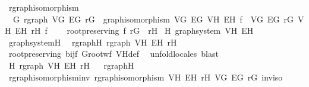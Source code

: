 \begin{isabellebody}
\isanewline
{}\isamarkupfalse%
\ rgraph{\isacharunderscore}{\kern0pt}isomorphism\ {\isacharequal}{\kern0pt}\isanewline
\ \ G{\isacharcolon}{\kern0pt}\ rgraph\ V\isactrlsub G\ E\isactrlsub G\ r\isactrlsub G\ {\isacharplus}{\kern0pt}\ graph{\isacharunderscore}{\kern0pt}isomorphism\ V\isactrlsub G\ E\isactrlsub G\ V\isactrlsub H\ E\isactrlsub H\ f\ \ V\isactrlsub G\ E\isactrlsub G\ r\isactrlsub G\ V\isactrlsub H\ E\isactrlsub H\ r\isactrlsub H\ f\ {\isacharplus}{\kern0pt}\isanewline
\ \ \ root{\isacharunderscore}{\kern0pt}preserving{\isacharcolon}{\kern0pt}\ {\isachardoublequoteopen}f\ r\isactrlsub G\ {\isacharequal}{\kern0pt}\ r\isactrlsub H{\isachardoublequoteclose}\isanewline
{}\isanewline
\isanewline
{}\isamarkupfalse%
\ H{\isacharcolon}{\kern0pt}\ graph{\isacharunderscore}{\kern0pt}system\ V\isactrlsub H\ E\isactrlsub H%
\isadelimproof
\ %
\endisadelimproof
%
\isatagproof
{}\isamarkupfalse%
\ graph{\isacharunderscore}{\kern0pt}system{\isacharunderscore}{\kern0pt}H\ \isacommand{{\isachardot}{\kern0pt}}\isamarkupfalse%
%
\endisatagproof
{\isafoldproof}%
%
\isadelimproof
%
\endisadelimproof
\isanewline
\isanewline
{}\isamarkupfalse%
\ rgraph{\isacharunderscore}{\kern0pt}H{\isacharcolon}{\kern0pt}\ {\isachardoublequoteopen}rgraph\ V\isactrlsub H\ E\isactrlsub H\ r\isactrlsub H{\isachardoublequoteclose}\isanewline
%
\isadelimproof
\ \ %
\endisadelimproof
%
\isatagproof
{}\isamarkupfalse%
\ root{\isacharunderscore}{\kern0pt}preserving\ bij{\isacharunderscore}{\kern0pt}f\ G{\isachardot}{\kern0pt}root{\isacharunderscore}{\kern0pt}wf\ V\isactrlsub H{\isacharunderscore}{\kern0pt}def\ \isamarkupfalse%
\ unfold{\isacharunderscore}{\kern0pt}locales\ blast%
\endisatagproof
{\isafoldproof}%
%
\isadelimproof
\isanewline
%
\endisadelimproof
\isanewline
{}\isamarkupfalse%
\ H{\isacharcolon}{\kern0pt}\ rgraph\ V\isactrlsub H\ E\isactrlsub H\ r\isactrlsub H%
\isadelimproof
\ %
\endisadelimproof
%
\isatagproof
{}\isamarkupfalse%
\ rgraph{\isacharunderscore}{\kern0pt}H\ \isacommand{{\isachardot}{\kern0pt}}\isamarkupfalse%
%
\endisatagproof
{\isafoldproof}%
%
\isadelimproof
%
\endisadelimproof
\isanewline
\isanewline
{}\isamarkupfalse%
\ rgraph{\isacharunderscore}{\kern0pt}isomorphism{\isacharunderscore}{\kern0pt}inv{\isacharcolon}{\kern0pt}\ {\isachardoublequoteopen}rgraph{\isacharunderscore}{\kern0pt}isomorphism\ V\isactrlsub H\ E\isactrlsub H\ r\isactrlsub H\ V\isactrlsub G\ E\isactrlsub G\ r\isactrlsub G\ inv{\isacharunderscore}{\kern0pt}iso{\isachardoublequoteclose}\ \isanewline

\end{isabellebody}
